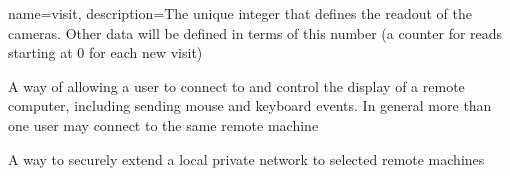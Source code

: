 

{
  name={visit},
  description={The unique integer that defines the readout of the \SPS cameras.  Other data
  will be defined in terms of this number (\eg a counter for \AGC reads starting at 0 for
  each new \gls{visit})}
}

{A way of allowing a user to connect to and control the display of a remote computer, including sending
mouse and keyboard events.  In general more than one user may connect to the same remote machine}

{A way to securely extend a local private network to selected remote machines}
